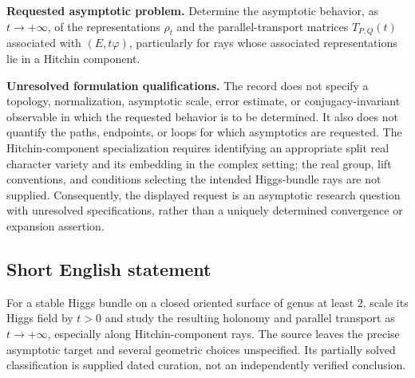 \documentclass[11pt]{article}
\begin{document}
\textbf{Requested asymptotic problem.} Determine the asymptotic behavior, as \(t\to+\infty\), of the representations \(\rho_t\) and the parallel-transport matrices \(T_{P,Q}(t)\) associated with \((E,t\varphi)\), particularly for rays whose associated representations lie in a Hitchin component.

\textbf{Unresolved formulation qualifications.} The record does not specify a topology, normalization, asymptotic scale, error estimate, or conjugacy-invariant observable in which the requested behavior is to be determined. It also does not quantify the paths, endpoints, or loops for which asymptotics are requested. The Hitchin-component specialization requires identifying an appropriate split real character variety and its embedding in the complex setting; the real group, lift conventions, and conditions selecting the intended Higgs-bundle rays are not supplied. Consequently, the displayed request is an asymptotic research question with unresolved specifications, rather than a uniquely determined convergence or expansion assertion.
\subsection{Short English statement}
For a stable Higgs bundle on a closed oriented surface of genus at least \(2\), scale its Higgs field by \(t>0\) and study the resulting holonomy and parallel transport as \(t\to+\infty\), especially along Hitchin-component rays. The source leaves the precise asymptotic target and several geometric choices unspecified. Its partially solved classification is supplied dated curation, not an independently verified conclusion.
\end{document}
